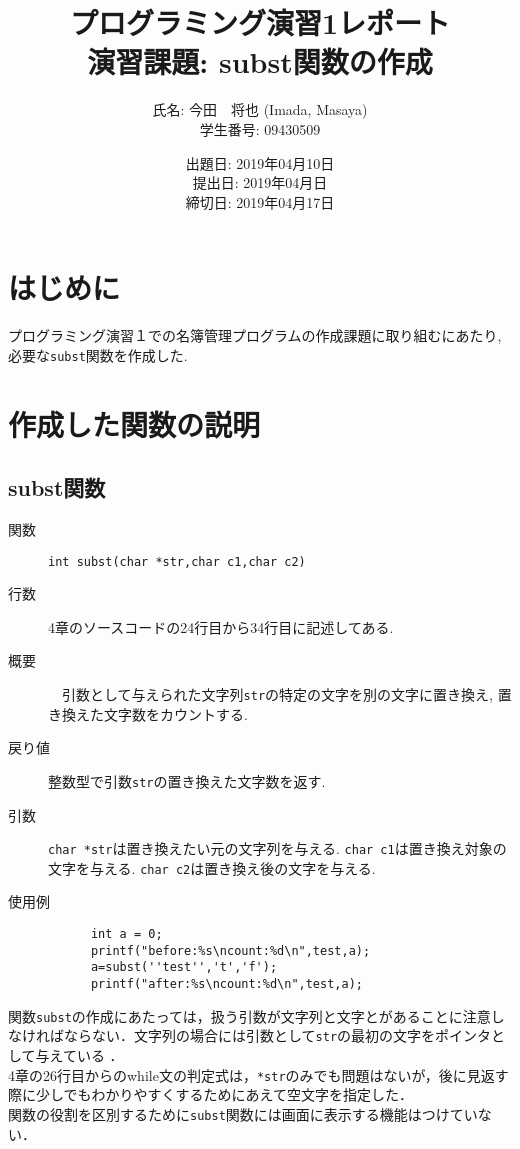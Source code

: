 \documentclass[a4j,11pt]{jarticle}
\title{プログラミング演習1レポート \\
       演習課題: subst関数の作成}
\author{氏名: 今田　将也 (Imada, Masaya) \\
        学生番号: 09430509}
\date{出題日: 2019年04月10日 \\
      提出日: 2019年04月日 \\
      締切日: 2019年04月17日 \\}  %
\begin{document}
\maketitle

\section{はじめに}
プログラミング演習１での名簿管理プログラムの作成課題に取り組むにあたり, 必要な\verb|subst|関数を作成した. 
\section{作成した関数の説明}
 \subsection{subst関数}
  \begin{description}
    \item[関数] \verb|int subst(char *str,char c1,char c2)|
    \item[行数]  4章のソースコードの24行目から34行目に記述してある.
    \item[概要]　引数として与えられた文字列\verb|str|の特定の文字を別の文字に置き換え, 置き換えた文字数をカウントする.
    \item[戻り値]整数型で引数\verb|str|の置き換えた文字数を返す.
    \item[引数]  \verb|char *str|は置き換えたい元の文字列を与える. \verb|char c1|は置き換え対象の文字を与える. \verb|char c2|は置き換え後の文字を与える.
    \item[使用例]
      \begin{verbatim}
      int a = 0;
      printf("before:%s\ncount:%d\n",test,a);
      a=subst(''test'','t','f');
      printf("after:%s\ncount:%d\n",test,a);
      \end{verbatim}
	
  \end{description}
関数\verb|subst|の作成にあたっては，扱う引数が文字列と文字とがあることに注意しなければならない．文字列の場合には引数として\verb|str|の最初の文字をポインタとして与えている
．\\4章の26行目からのwhile文の判定式は，\verb|*str|のみでも問題はないが，後に見返す際に少しでもわかりやすくするためにあえて空文字を指定した．\\関数の役割を区別するために\verb|subst|関数には画面に表示する機能はつけていない．
\end{document}
